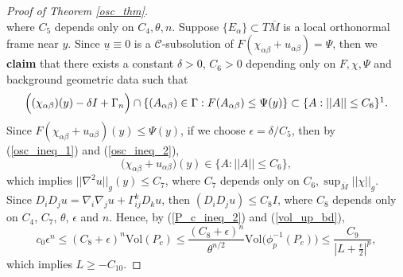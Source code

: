 \documentclass[12pt]{amsart}
\theoremstyle{definition}
\theoremstyle{remark}
\numberwithin{equation}{section}
\begin{document}
\begin{proof}[Proof of Theorem \ref{osc_thm}]
\begin{equation}
	\end{equation} 
	where $C_5$ depends only on $C_4, \theta, n$.
	Suppose $\{E_\alpha\} \subset T\overline{M}$ is a local orthonormal frame near $y$.
	Since $\underline{u} \equiv 0$ is a $\mathcal{C}$-subsolution of $F(\chi_{\alpha\beta} + u_{\alpha\beta}) = \Psi$, then we \textbf{claim} that there exists a constant $\delta > 0$, $C_6 > 0$ depending only on $F, \chi, \Psi$ and background geometric data such that
	\begin{equation}\label{osc_ineq_2}
	\Big((\chi_{\alpha\beta})(y) - \delta I + \Gamma_n \Big) \cap \{ (A_{\alpha\beta}) \in \Gamma: F(A_{\alpha\beta}) \leq \Psi(y) \} \subset \{A: ||A|| \leq C_6\}\footnotemark.
	\end{equation}
	Since $F(\chi_{\alpha\beta} + u_{\alpha\beta})(y) \leq \Psi(y)$, if we choose $\epsilon = \delta/C_5$, then by (\ref{osc_ineq_1}) and (\ref{osc_ineq_2}),
	\begin{equation}
	\big(\chi_{\alpha\beta} + u_{\alpha\beta}\big) (y) \in \{A: ||A|| \leq C_6\},
	\end{equation}
	which implies $||\nabla^2 u||_g(y) \leq C_7$, where $C_7$ depends only on $C_6, \sup_{\overline{M}}||\chi||_g$. Since $D_i D_j u  = \nabla_i\nabla_j u + \Gamma_{ij}^k D_k u$, then $(D_i D_j u) \leq C_8 I$, where $C_8$ depends only on $C_4$, $C_7$, $\theta$, $\epsilon$ and $n$. 
	Hence,	by (\ref{P_c_ineq_2}) and (\ref{vol_up_bd}), 
	\begin{equation}
	c_0 \epsilon^n \leq (C_8 + \epsilon)^n \text{Vol}(P_c) \leq \frac{(C_8 + \epsilon)^n}{\theta^{n/2}} \text{Vol}\big(\phi_p^{-1}(P_c)\big) \leq \frac{C_9}{\left|L + \frac{\epsilon}{2}\right|^p},
	\end{equation}
	which implies $L \geq - C_{10}$.
	

\end{proof}
\end{document}
